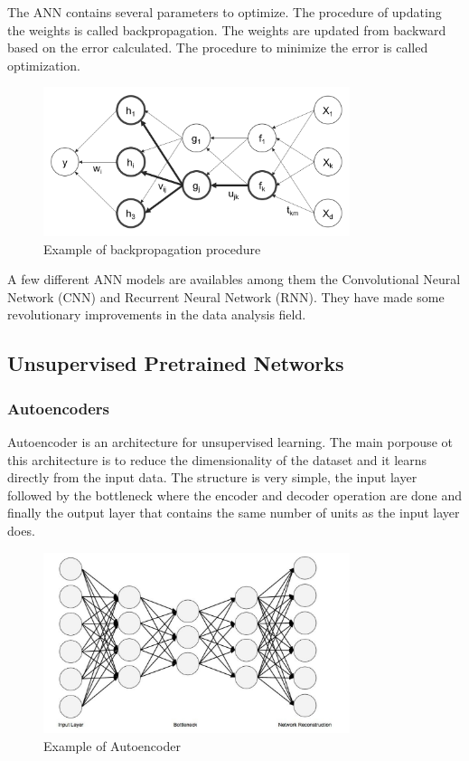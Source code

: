 The ANN contains several parameters to optimize. The procedure of updating the weights is called backpropagation. The weights are updated from backward based on the error calculated. The procedure to minimize the error is called optimization.

\begin{figure}[H]
\centering
\includegraphics[width=0.8\textwidth]{./figures/backpropagation}
\caption{Example of backpropagation procedure \cite{rajalingappaa}}
\end{figure}

   
A few different ANN models are availables among them the Convolutional Neural Network (CNN) and Recurrent Neural Network (RNN). They have made some revolutionary improvements in the data analysis field. 

\subsection[Unsupervised Pretrained Networks]{Unsupervised Pretrained Networks}

\subsubsection[Autoencoders]{Autoencoders}

Autoencoder is an architecture for unsupervised learning. The main porpouse ot this architecture is to reduce the dimensionality of the dataset and it learns directly from the input data. 
The structure is very simple, the input layer followed by the bottleneck where the encoder and decoder operation are done and finally the output layer that contains the same number of units as the input layer does.\cite{dp4j-deep-learning}

\begin{figure}[H]
\centering
\includegraphics[width=0.8\textwidth]{./figures/autoencoder}
\caption{Example of Autoencoder \cite{dp4j-deep-learning}}
\end{figure}


